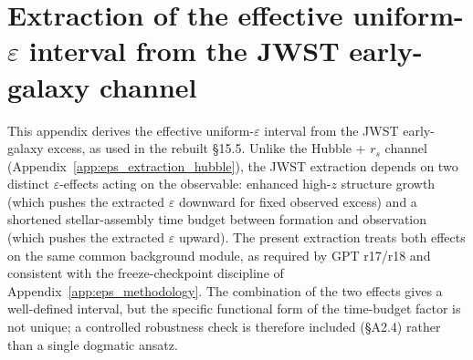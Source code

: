 %
%
%
%

\section{Extraction of the effective uniform-$\varepsilon$ interval
from the JWST early-galaxy channel}
\label{app:eps_extraction_jwst}

This appendix derives the effective uniform-$\varepsilon$ interval
from the JWST early-galaxy excess, as used in the rebuilt \S15.5.
Unlike the Hubble + $r_s$ channel (Appendix~\ref{app:eps_extraction_hubble}),
the JWST extraction depends on two distinct $\varepsilon$-effects
acting on the observable: enhanced high-$z$ structure growth (which
pushes the extracted $\varepsilon$ downward for fixed observed
excess) and a shortened stellar-assembly time budget between
formation and observation (which pushes the extracted $\varepsilon$
upward). The present extraction treats both effects on the same
common background module, as required by GPT r17/r18 and consistent
with the freeze-checkpoint discipline of
Appendix~\ref{app:eps_methodology}. The combination of the two
effects gives a well-defined interval, but the specific functional
form of the time-budget factor is not unique; a controlled
robustness check is therefore included (\S A2.4) rather than a
single dogmatic ansatz.

